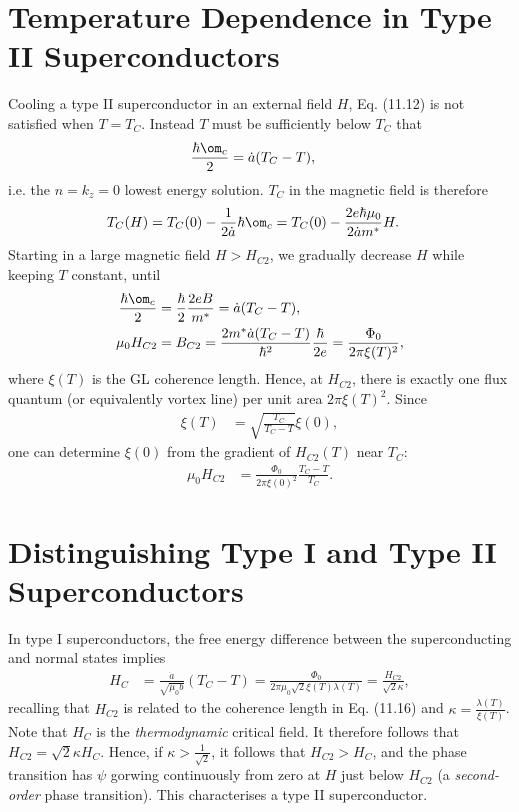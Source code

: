 \documentclass[qo.tex]{subfiles}
\begin{document}
\section{Temperature Dependence in Type II Superconductors}
Cooling a type II superconductor in an external field $H$, Eq. (11.12) is not satisfied when $T=T_C$.
Instead $T$ must be sufficiently below $T_C$ that
\begin{align}
    \frac{\hbar\om_c}{2} &= \dot{a}(T_C-T),
\end{align}
i.e. the $n=k_z=0$ lowest energy solution. 
$T_C$ in the magnetic field is therefore
\begin{align}
    T_C(H) &= T_C(0) - \frac{1}{2\dot{a}}\hbar\om_c = T_C(0) - \frac{2e\hbar\mu_0}{2\dot{a}m^*}H.
\end{align}
Starting in a large magnetic field $H>H_{C2}$, we gradually decrease $H$ while keeping $T$ constant, until 
\begin{align}
    \frac{\hbar\om_c}{2} &= \frac{\hbar}{2}\frac{2eB}{m^*} = \dot{a}(T_C-T), \\
    \mu_0H_{C2} &= B_{C2} = \frac{2m^*\dot{a}(T_C-T)}{\hbar^2}\frac{\hbar}{2e} = \frac{\Phi_0}{2\pi\xi(T)^2},
\end{align}
where $\xi(T)$ is the GL coherence length. 
Hence, at $H_{C2}$, there is exactly one flux quantum (or equivalently vortex line) per unit area $2\pi\xi(T)^2$.
Since 
\begin{align}
    \xi(T) &= \sqrt{\frac{T_C}{T_C-T}}\xi(0),
\end{align}
one can determine $\xi(0)$ from the gradient of $H_{C2}(T)$ near $T_C$:
\begin{align}
    \mu_0H_{C2} &= \frac{\Phi_0}{2\pi\xi(0)^2}\frac{T_C-T}{T_C}.
\end{align}

\section{Distinguishing Type I and Type II Superconductors}
In type I superconductors, the free energy difference between the superconducting and normal states implies
\begin{align}
    H_C &= \frac{\dot{a}}{\sqrt{\mu_0b}}(T_C-T) = \frac{\Phi_0}{2\pi\mu_0\sqrt{2}\xi(T)\lambda(T)} = \frac{H_{C2}}{\sqrt{2}\kappa},
\end{align}
recalling that $H_{C2}$ is related to the coherence length in Eq. (11.16) and $\kappa=\frac{\lambda(T)}{\xi(T)}$.
Note that $H_C$ is the \emph{thermodynamic} critical field. 
It therefore follows that $H_{C2} = \sqrt{2}\kappa H_C$.
Hence, if $\kappa>\frac{1}{\sqrt{2}}$, it follows that $H_{C2}>H_C$, and the phase transition has $\psi$ gorwing continuously from zero at $H$ just below $H_{C2}$ (a \emph{second-order} phase transition).
This characterises a type II superconductor. 
\end{document}
